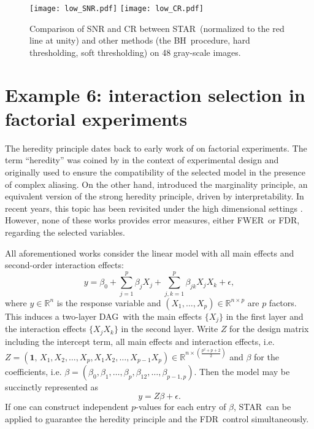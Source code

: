 \documentclass{biometrika}
\newcommand{\textFDR}{FDR}
\newcommand{\textFWER}{FWER}
\renewcommand{\star}{STAR}
\newcommand{\bh}{BH}
\newcommand{\DAG}{DAG}
\newcommand{\eps}{\epsilon}
\newcommand{\lb}{\left(}
\newcommand{\rb}{\right)}
\newcommand{\R}{\mathbb{R}}
\newcommand{\1}{\mathbf{1}}
\begin{document}
\begin{figure}[h]
  \centering
  \texttt{[image: low\_SNR.pdf]}\hspace{1.5cm}
  \texttt{[image: low\_CR.pdf]}
  \caption{Comparison of SNR and CR between \star ~(normalized to the red line at unity) and other methods (the \bh ~procedure, hard thresholding, soft thresholding) on 48 gray-scale images.}\label{fig:SNR_CR}
\end{figure}

\section{Example 6: interaction selection in factorial experiments}\label{sec:factorial}
The heredity principle dates back to early work of \cite{yates37} on factorial experiments. The term ``heredity'' was coined by \cite{hamada92} in the context of experimental design and originally used to ensure the compatibility of the selected model in the presence of complex aliasing. On the other hand, \cite{nelder77} introduced the marginality principle, an equivalent version of the strong heredity principle, driven by interpretability. In recent years, this topic has been revisited under the high dimensional settings \citep[e.g.,][]{yuan09, choi10, bien13}. However, none of these works provides error measures, either \textFWER ~or \textFDR, regarding the selected variables. 

All aforementioned works consider the linear model with all main effects and second-order interaction effects:
\[
y = \beta_{0} + \sum_{j=1}^{p}\beta_{j}X_{j} + \sum_{j,k=1}^{p}\beta_{jk}X_{j}X_{k} + \eps,
\]
where $y\in \R^{n}$ is the response variable and $(X_{1}, \ldots, X_{p})\in \R^{n\times p}$ are $p$ factors. This induces a two-layer \DAG ~with the main effects $\{X_{j}\}$ in the first layer and the interaction effects $\{X_{j}X_{k}\}$ in the second layer. Write $Z$ for the design matrix including the intercept term, all main effects and interaction effects, i.e. $Z = (\textbf{1},\, X_{1}, X_{2}, \ldots, X_{p}, X_{1}X_{2}, \ldots, X_{p-1}X_{p})\in \R^{n\times \lb \frac{p^2 + p + 2}{2}\rb}$ and $\beta$ for the coefficients, i.e. $\beta = (\beta_{0}, \beta_{1}, \ldots, \beta_{p}, \beta_{12}, \ldots, \beta_{p-1,p})$. Then the model may be succinctly represented as
\[
y = Z\beta + \eps.
\]
If one can construct independent $p$-values for each entry of $\beta$, \star ~can be applied to guarantee the heredity principle and the \textFDR ~control simultaneously.
\end{document}
